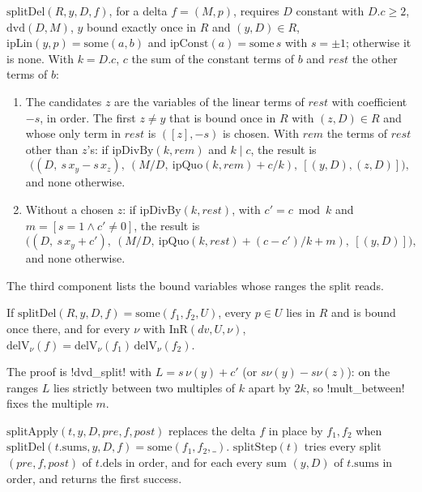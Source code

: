 \begin{definition}\label{def:lean-sym-splitdel}
$\mathrm{splitDel}(R,y,D,f)$, for a delta $f=(M,p)$, requires $D$ constant with $D.c\ge2$, $\mathrm{dvd}(D,M)$, $y$ bound exactly once in $R$ and $(y,D)\in R$, $\mathrm{ipLin}(y,p)=\mathrm{some}(a,b)$ and $\mathrm{ipConst}(a)=\mathrm{some}\,s$ with $s=\pm1$; otherwise it is $\mathrm{none}$. With $k=D.c$, $c$ the sum of the constant terms of $b$ and $\mathit{rest}$ the other terms of $b$:
\begin{enumerate}
\item The candidates $z$ are the variables of the linear terms of $\mathit{rest}$ with coefficient $-s$, in order. The first $z\neq y$ that is bound once in $R$ with $(z,D)\in R$ and whose only term in $\mathit{rest}$ is $([z],-s)$ is chosen. With $\mathit{rem}$ the terms of $\mathit{rest}$ other than $z$'s: if $\mathrm{ipDivBy}(k,\mathit{rem})$ and $k\mid c$, the result is
\[
\bigl((D,\ s\,x_y-s\,x_z),\ (M/D,\ \mathrm{ipQuo}(k,\mathit{rem})+c/k),\ [(y,D),(z,D)]\bigr),
\]
and $\mathrm{none}$ otherwise.
\item Without a chosen $z$: if $\mathrm{ipDivBy}(k,\mathit{rest})$, with $c'=c\bmod k$ and $m=[s=1\land c'\ne0]$, the result is
\[
\bigl((D,\ s\,x_y+c'),\ (M/D,\ \mathrm{ipQuo}(k,\mathit{rest})+(c-c')/k+m),\ [(y,D)]\bigr),
\]
and $\mathrm{none}$ otherwise.
\end{enumerate}
The third component lists the bound variables whose ranges the split reads.
\end{definition}

\begin{theorem}
If $\mathrm{splitDel}(R,y,D,f)=\mathrm{some}(f_1,f_2,U)$, every $p\in U$ lies in $R$ and is bound once there, and for every $\nu$ with $\mathrm{InR}(dv,U,\nu)$, $\mathrm{delV}_\nu(f)=\mathrm{delV}_\nu(f_1)\,\mathrm{delV}_\nu(f_2)$.
\end{theorem}

The proof is \lean!dvd_split! with $L=s\,\nu(y)+c'$ (or $s\nu(y)-s\nu(z)$): on the ranges $L$ lies strictly between two multiples of $k$ apart by $2k$, so \lean!mult_between! fixes the multiple $m$.

\begin{definition}
\begin{sloppypar}$\mathrm{splitApply}(t,y,D,\mathit{pre},f,\mathit{post})$ replaces the delta $f$ in place by $f_1,f_2$ when $\mathrm{splitDel}(t.\mathrm{sums},y,D,f)=\mathrm{some}(f_1,f_2,\_)$. $\mathrm{splitStep}(t)$ tries every split $(\mathit{pre},f,\mathit{post})$ of $t.\mathrm{dels}$ in order, and for each every sum $(y,D)$ of $t.\mathrm{sums}$ in order, and returns the first success.\end{sloppypar}
\end{definition}

